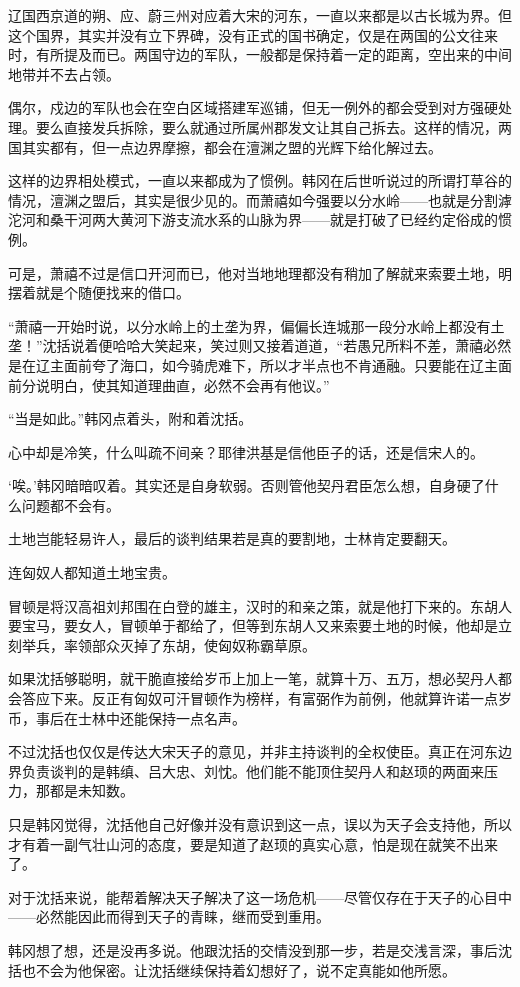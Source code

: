 辽国西京道的朔、应、蔚三州对应着大宋的河东，一直以来都是以古长城为界。但这个国界，其实并没有立下界碑，没有正式的国书确定，仅是在两国的公文往来时，有所提及而已。两国守边的军队，一般都是保持着一定的距离，空出来的中间地带并不去占领。

偶尔，戍边的军队也会在空白区域搭建军巡铺，但无一例外的都会受到对方强硬处理。要么直接发兵拆除，要么就通过所属州郡发文让其自己拆去。这样的情况，两国其实都有，但一点边界摩擦，都会在澶渊之盟的光辉下给化解过去。

这样的边界相处模式，一直以来都成为了惯例。韩冈在后世听说过的所谓打草谷的情况，澶渊之盟后，其实是很少见的。而萧禧如今强要以分水岭——也就是分割滹沱河和桑干河两大黄河下游支流水系的山脉为界——就是打破了已经约定俗成的惯例。

可是，萧禧不过是信口开河而已，他对当地地理都没有稍加了解就来索要土地，明摆着就是个随便找来的借口。

“萧禧一开始时说，以分水岭上的土垄为界，偏偏长连城那一段分水岭上都没有土垄！”沈括说着便哈哈大笑起来，笑过则又接着道道，“若愚兄所料不差，萧禧必然是在辽主面前夸了海口，如今骑虎难下，所以才半点也不肯通融。只要能在辽主面前分说明白，使其知道理曲直，必然不会再有他议。”

“当是如此。”韩冈点着头，附和着沈括。

心中却是冷笑，什么叫疏不间亲？耶律洪基是信他臣子的话，还是信宋人的。

‘唉。’韩冈暗暗叹着。其实还是自身软弱。否则管他契丹君臣怎么想，自身硬了什么问题都不会有。

土地岂能轻易许人，最后的谈判结果若是真的要割地，士林肯定要翻天。

连匈奴人都知道土地宝贵。

冒顿是将汉高祖刘邦围在白登的雄主，汉时的和亲之策，就是他打下来的。东胡人要宝马，要女人，冒顿单于都给了，但等到东胡人又来索要土地的时候，他却是立刻举兵，率领部众灭掉了东胡，使匈奴称霸草原。

如果沈括够聪明，就干脆直接给岁币上加上一笔，就算十万、五万，想必契丹人都会答应下来。反正有匈奴可汗冒顿作为榜样，有富弼作为前例，他就算许诺一点岁币，事后在士林中还能保持一点名声。

不过沈括也仅仅是传达大宋天子的意见，并非主持谈判的全权使臣。真正在河东边界负责谈判的是韩缜、吕大忠、刘忱。他们能不能顶住契丹人和赵顼的两面来压力，那都是未知数。

只是韩冈觉得，沈括他自己好像并没有意识到这一点，误以为天子会支持他，所以才有着一副气壮山河的态度，要是知道了赵顼的真实心意，怕是现在就笑不出来了。

对于沈括来说，能帮着解决天子解决了这一场危机——尽管仅存在于天子的心目中——必然能因此而得到天子的青睐，继而受到重用。

韩冈想了想，还是没再多说。他跟沈括的交情没到那一步，若是交浅言深，事后沈括也不会为他保密。让沈括继续保持着幻想好了，说不定真能如他所愿。

